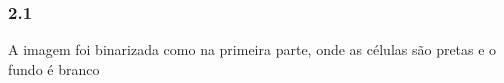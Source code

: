 \documentclass[journal]{IEEEtran}
\begin{document}
\begin{figure}[h]
\centering
{}
\end{figure}



\subsubsection*{2.1}
A imagem foi binarizada como na primeira parte, onde as células são pretas e o fundo é branco
\end{document}
